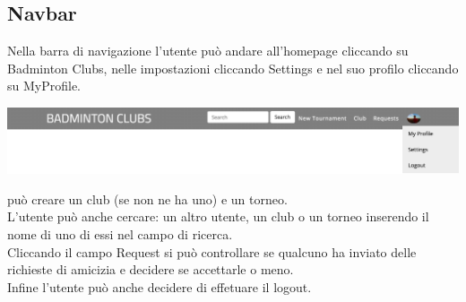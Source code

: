 \documentclass{article}
\begin{document}
\subsection{Navbar}
Nella barra di navigazione l'utente può andare all'homepage cliccando su Badminton Clubs, nelle impostazioni cliccando Settings e nel suo profilo cliccando su MyProfile.
\begin{center}
    \includegraphics[width=16cm]{UX/navbar}
\end{center}
può creare un club (se non ne ha uno) e un torneo. \\
L'utente può anche cercare: un altro utente, un club o un torneo inserendo il nome di uno di essi nel campo di ricerca.\\
Cliccando il campo Request si può controllare se qualcuno ha inviato delle richieste di amicizia e decidere se accettarle o meno.\\
Infine l'utente può anche decidere di effetuare il logout.
\end{document}
